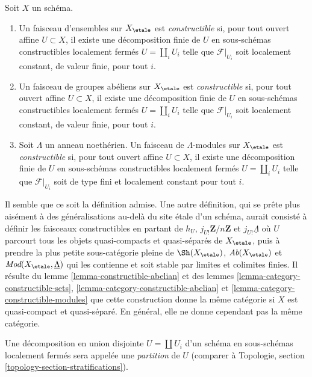 \begin{definition}
\label{definition-constructible}
Soit $X$ un schéma.
\begin{enumerate}
\item Un faisceau d'ensembles sur $X_\etale$ est {\it constructible}
si, pour tout ouvert affine $U \subset X$, il existe une décomposition finie
de $U$ en sous-schémas constructibles localement fermés $U = \coprod_i U_i$
telle que $\mathcal{F}|_{U_i}$ soit localement constant, de valeur finie, pour tout $i$.
\item Un faisceau de groupes abéliens sur $X_\etale$ est {\it constructible}
si, pour tout ouvert affine $U \subset X$, il existe une décomposition finie
de $U$ en sous-schémas constructibles localement fermés $U = \coprod_i U_i$
telle que $\mathcal{F}|_{U_i}$ soit localement constant, de valeur finie, pour tout $i$.
\item Soit $\Lambda$ un anneau noethérien. Un faisceau de $\Lambda$-modules
sur $X_\etale$ est {\it constructible} si, pour tout ouvert affine
$U \subset X$, il existe une décomposition finie
de $U$ en sous-schémas constructibles localement fermés
$U = \coprod_i U_i$ telle que
$\mathcal{F}|_{U_i}$ soit de type fini et localement constant pour tout $i$.
\end{enumerate}
\end{definition}

\noindent
Il semble que ce soit la définition admise. Une autre définition, qui se prête
plus aisément à des généralisations au-delà du site étale d'un schéma,
aurait consisté à définir les faisceaux constructibles en partant de
$h_U$, $j_{U!}\mathbf{Z}/n\mathbf{Z}$ et $j_{U!}\underline{\Lambda}$
où $U$ parcourt tous les objets quasi-compacts et quasi-séparés
de $X_\etale$, puis à prendre la plus petite sous-catégorie pleine de
$\Sh(X_\etale)$, $\textit{Ab}(X_\etale)$ et
$\textit{Mod}(X_\etale, \underline{\Lambda})$ qui les contienne
et soit stable par limites et colimites finies. Il résulte du
lemme \ref{lemma-constructible-abelian}
et des
lemmes \ref{lemma-category-constructible-sets},
\ref{lemma-category-constructible-abelian} et
\ref{lemma-category-constructible-modules}
que cette construction donne la même catégorie si $X$ est quasi-compact et
quasi-séparé. En général, elle ne donne cependant pas la même
catégorie.

\medskip\noindent
Une décomposition en union disjointe $U = \coprod U_i$ d'un schéma en
sous-schémas localement fermés sera appelée une {\it partition} de $U$
(comparer à Topologie, section \ref{topology-section-stratifications}).

